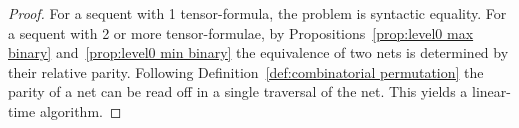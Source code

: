 \begin{proof}
For a sequent with 1 tensor-formula, the problem is syntactic equality.
%
For a sequent with 2 or more tensor-formulae, by Propositions~\ref{prop:level0 max binary} and~\ref{prop:level0 min binary} the equivalence of two nets is determined by their relative parity.
%
Following Definition~\ref{def:combinatorial permutation} the parity of a net can be read off in a single traversal of the net.
%
This yields a linear-time algorithm.
%
\end{proof}











